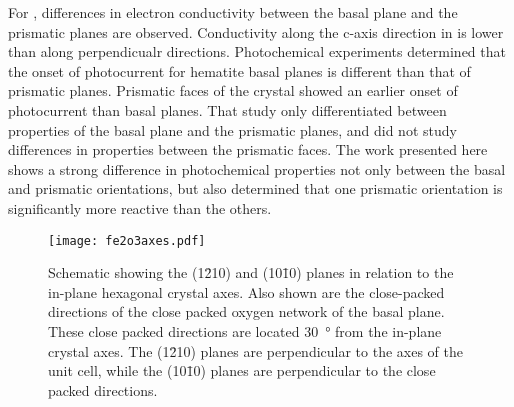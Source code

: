 For , differences in electron conductivity between the basal plane and the prismatic planes are observed. Conductivity along the c-axis direction in  is lower than along perpendicualr directions.\cite{Huda:2010kx,Iordanova:2005ha} Photochemical experiments determined that the onset of photocurrent for hematite basal planes is different than that of prismatic planes.\cite{Eggleston:2009ic} Prismatic faces of the crystal showed an earlier onset of photocurrent than basal planes. That study only differentiated between properties of the basal plane and the prismatic planes, and did not study differences in properties between the prismatic faces. The work presented here shows a strong difference in photochemical properties not only between the basal and prismatic orientations, but also determined that one prismatic orientation is significantly more reactive than the others. 

\begin{figure}
\begin{center}
\texttt{[image: fe2o3axes.pdf]}
\caption[(1\={2}10) and (10\={1}0) planes in relation to in-plane crystal axes]{%
	Schematic showing the (1\={2}10) and (10\={1}0) planes in 
	relation to the in-plane hexagonal crystal axes. Also shown 
	are the close-packed directions of the close packed oxygen 
	network of the basal plane. These close packed directions are 
	located \SI{30}{\degree} from the in-plane crystal axes. The 
	(1\={2}10) planes are perpendicular to the axes of the unit 
	cell, while the (10\={1}0) planes are perpendicular to the 
	close packed directions.
}
\label{fig:fe2o3axes}
\end{center}
\end{figure}
			
